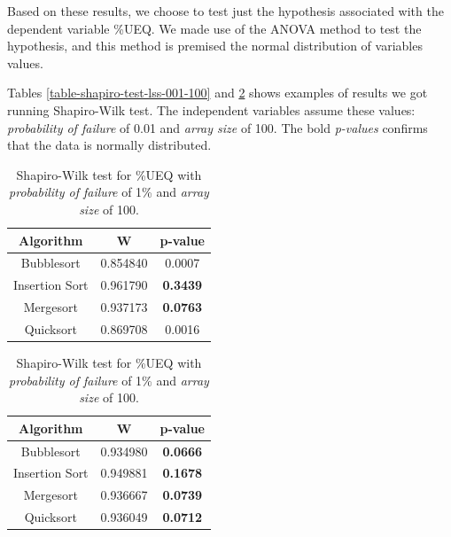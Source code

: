 Based on these results, we choose to test just the hypothesis associated with the dependent variable \%UEQ. We made use of the ANOVA method to test the hypothesis, and this method is premised the normal distribution of variables values.

Tables \ref{table-shapiro-test-lss-001-100} and \ref{table-shapiro-test-ueq-001-100} shows examples of results we got running Shapiro-Wilk test. The independent variables assume these values: \textit{probability of failure} of 0.01 and \textit{array size} of 100. The bold \textit{p-values} confirms that the data is normally distributed.

\begin{table}[H]
    \parbox{.45\linewidth}{
        \caption{Shapiro-Wilk test for \%LSS with \textit{probability of failure} of 1\% and \textit{array size} of 100.}
        \begin{center}
        \begin{tabular}{|c|c|c|}
        \hline
        \textbf{Algorithm} & \textbf{W} & \textbf{p-value} \\
        \hline
        Bubblesort & 0.854840 & 0.0007 \\
        \hline
        Insertion Sort & 0.961790 & \textbf{0.3439} \\
        \hline
        Mergesort & 0.937173 & \textbf{0.0763} \\
        \hline
        Quicksort & 0.869708 & 0.0016 \\
        \hline
        \end{tabular}
        \label{table-shapiro-test-lss-001-100}
        \end{center}
    }
    \hfill
    \parbox{.45\linewidth}{
        \caption{Shapiro-Wilk test for \%UEQ with \textit{probability of failure} of 1\% and \textit{array size} of 100.}
        \begin{center}
        \begin{tabular}{|c|c|c|}
        \hline
        \textbf{Algorithm} & \textbf{W} & \textbf{p-value} \\
        \hline
        Bubblesort & 0.934980 & \textbf{0.0666} \\
        \hline
        Insertion Sort & 0.949881 & \textbf{0.1678} \\
        \hline
        Mergesort & 0.936667 & \textbf{0.0739} \\
        \hline
        Quicksort & 0.936049 & \textbf{0.0712} \\
        \hline
        \end{tabular}
        \label{table-shapiro-test-ueq-001-100}
        \end{center}
    }
\end{table}

